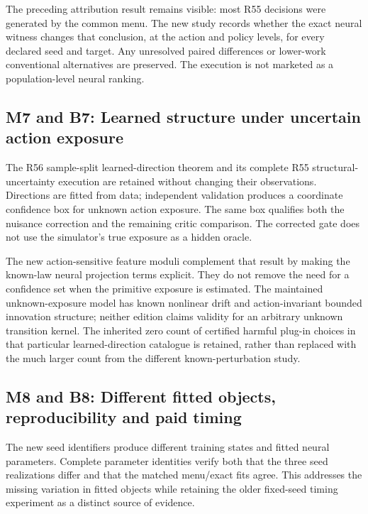 The preceding attribution result remains visible: most R55 decisions
were generated by the common menu. The new study records whether the
exact neural witness changes that conclusion, at the action and policy
levels, for every declared seed and target. Any unresolved paired
differences or lower-work conventional alternatives are preserved. The
execution is not marketed as a population-level neural ranking.

\hypertarget{m7-and-b7-learned-structure-under-uncertain-action-exposure}{%
\subsection{M7 and B7: Learned structure under uncertain action
exposure}\label{m7-and-b7-learned-structure-under-uncertain-action-exposure}}

The R56 sample-split learned-direction theorem and its complete R55
structural-uncertainty execution are retained without changing their
observations. Directions are fitted from data; independent validation
produces a coordinate confidence box for unknown action exposure. The
same box qualifies both the nuisance correction and the remaining critic
comparison. The corrected gate does not use the simulator's true
exposure as a hidden oracle.

The new action-sensitive feature moduli complement that result by making
the known-law neural projection terms explicit. They do not remove the
need for a confidence set when the primitive exposure is estimated. The
maintained unknown-exposure model has known nonlinear drift and
action-invariant bounded innovation structure; neither edition claims
validity for an arbitrary unknown transition kernel. The inherited zero
count of certified harmful plug-in choices in that particular
learned-direction catalogue is retained, rather than replaced with the
much larger count from the different known-perturbation study.

\hypertarget{m8-and-b8-different-fitted-objects-reproducibility-and-paid-timing}{%
\subsection{M8 and B8: Different fitted objects, reproducibility and
paid
timing}\label{m8-and-b8-different-fitted-objects-reproducibility-and-paid-timing}}

The new seed identifiers produce different training states and fitted
neural parameters. Complete parameter identities verify both that the
three seed realizations differ and that the matched menu/exact fits
agree. This addresses the missing variation in fitted objects while
retaining the older fixed-seed timing experiment as a distinct source of
evidence.

